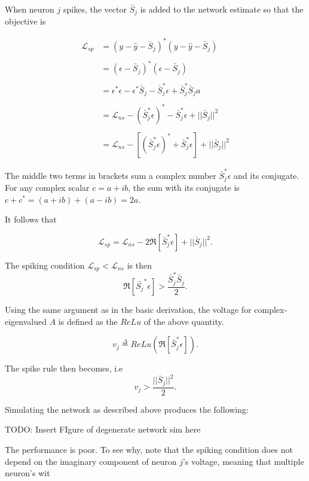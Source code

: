 \begin{enumerate}
When neuron $j$ spikes, the vector $\bar{S}_j$ is added to the network estimate so that the objective is

\begin{align*}
\mathcal{L}_{sp}
&=
(y - \hat{y} - \bar{S}_j)^*(y - \hat{y} - \bar{S}_j)
\\
\\
&=
\left(\epsilon-\bar{S}_j\right)^*\left(\epsilon-\bar{S}_j\right)
\\
\\
&=
\epsilon^*\epsilon  - \epsilon^*\bar{S}_j - \bar{S}_j^*\epsilon + \bar{S}_j^*\bar{S}_ja
\\
\\
&=
\mathcal{L}_{ns} - \left(\bar{S}_j^*\epsilon\right)^* - \bar{S}_j^* \epsilon + ||\bar{S}_j||^2 
\\
\\
&=
\mathcal{L}_{ns} - \left[\left(\bar{S}_j^*\epsilon\right)^* + \bar{S}_j^* \epsilon\right] + ||\bar{S}_j||^2 
\end{align*}

The middle two terms in brackets sum a complex number $\bar{S}_j^* \epsilon$  and its conjugate. For any complex scalar $c = a + ib$, the sum with its conjugate is $c + c^* = (a + ib) + (a - ib) = 2a$.

It follows that 

$$
\mathcal{L}_{sp} = \mathcal{L}_{ns} - 2 \Re \left[\bar{S}_j^*\epsilon\right] + ||\bar{S}_j||^2.
$$

The spiking condition $\mathcal{L}_{sp} < \mathcal{L}_{ns}$ is then
$$
\Re \left[\bar{S_j}^*\epsilon\right] > \frac{\bar{S}_j^* \bar{S}_j}{2}.
$$

Using the same argument as in the basic derivation, the voltage for complex-eigenvalued $A$ is defined as the $ReLu$ of the above quantity. 

$$
v_j \overset{\Delta}{=} ReLu\left(\Re \left[\bar{S}_j^*\epsilon\right] \right).
$$

The spike rule then becomes, i.e
$$
v_j > \frac{||\bar{S}_j||^2}{2}.
$$


Simulating the network as described above produces the following:

TODO: Insert FIgure of degenerate network sim here

The performance is poor. To see why, note that the spiking condition does not depend on the imaginary component of neuron $j$'s voltage, meaning that multiple neuron's wit  


\clearpage


\end{enumerate}
